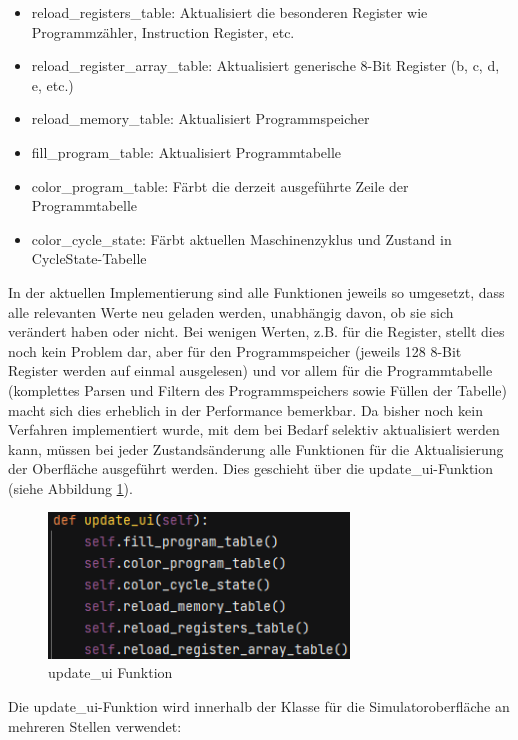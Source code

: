 \documentclass[12pt]{article}
\newcommand{\imgSpaceBefore}{\vspace{10pt}}
\begin{document}
\begin{itemize}
	\item reload\_registers\_table: Aktualisiert die besonderen Register wie Programmzähler, Instruction Register, etc.
	\item reload\_register\_array\_table: Aktualisiert generische 8-Bit Register (b, c, d, e, etc.)
	\item reload\_memory\_table: Aktualisiert Programmspeicher
	\item fill\_program\_table: Aktualisiert Programmtabelle
	\item color\_program\_table: Färbt die derzeit ausgeführte Zeile der Programmtabelle
	\item color\_cycle\_state: Färbt aktuellen Maschinenzyklus und Zustand in CycleState-Tabelle
\end{itemize}
\noindent
In der aktuellen Implementierung sind alle Funktionen jeweils so umgesetzt, dass alle relevanten Werte neu geladen werden, unabhängig davon, ob sie sich verändert haben oder nicht. Bei wenigen Werten, z.B. für die Register, stellt dies noch kein Problem dar, aber für den Programmspeicher (jeweils 128 8-Bit Register werden auf einmal ausgelesen) und vor allem für die Programmtabelle (komplettes Parsen und Filtern des Programmspeichers sowie Füllen der Tabelle) macht sich dies erheblich in der Performance bemerkbar. Da bisher noch kein Verfahren implementiert wurde, mit dem bei Bedarf selektiv aktualisiert werden kann, müssen bei jeder Zustandsänderung alle Funktionen für die Aktualisierung der Oberfläche ausgeführt werden. Dies geschieht über die \glqq update\_ui\grqq-Funktion (siehe Abbildung \ref{fig:updateUI}).\imgSpaceBefore

\begin{figure}[H]
\centering
\includegraphics[width=8cm]{bilder/updateUI}
\caption{update\_ui Funktion}
\label{fig:updateUI}
\end{figure}

\noindent
Die \glqq update\_ui\grqq-Funktion wird innerhalb der Klasse für die Simulatoroberfläche an mehreren Stellen verwendet:\imgSpaceBefore
\end{document}
